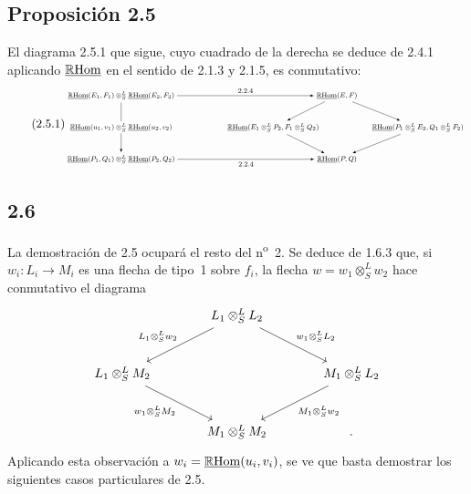 \subsection*{Proposición 2.5}
El diagrama 2.5.1 que sigue, cuyo cuadrado de la derecha se deduce de 2.4.1 aplicando $\underline{\mathbb{R}\mathrm{Hom}}$ en el sentido de 2.1.3 y 2.1.5, es conmutativo:
\begin{equation}\tag{2.5.1}
\resizebox{0.98\textwidth}{!}{%
\begin{tikzpicture}[>=latex,baseline=(current bounding box.center)]
\footnotesize
\node (A) at (0,2.6) {$\uRHom(E_1,F_1)\otimes^L_S\uRHom(E_2,F_2)$};
\node (C) at (0,0) {$\uRHom(P_1,Q_1)\otimes^L_S\uRHom(P_2,Q_2)$};
\node (D) at (8.8,2.6) {$\uRHom(E,F)$};
\node (E) at (6.2,1.3) {$\uRHom(E_1\otimes^L_SP_2,F_1\otimes^L_SQ_2)$};
\node (F) at (12.1,1.3) {$\uRHom(P_1\otimes^L_SE_2,Q_1\otimes^L_SF_2)$};
\node (G) at (8.8,0) {$\uRHom(P,Q)$};
\draw[->] (A) -- node[above] {$2.2.4$} (D);
\draw[->] (A) -- node[midway,fill=white,inner sep=2pt] {$\uRHom(u_1,v_1)\otimes^L_S\uRHom(u_2,v_2)$} (C);
\draw[->] (C) -- node[below] {$2.2.4$} (G);
\draw[->] (D) -- (E);
\draw[->] (D) -- (F);
\draw[->] (E) -- (G);
\draw[->] (F) -- (G);
\end{tikzpicture}}
\end{equation}

\subsection*{2.6}
La demostración de 2.5 ocupará el resto del n\textsuperscript{o}~2. Se deduce de 1.6.3 que, si $w_i:L_i\to M_i$ es una flecha de tipo~1 sobre $f_i$, la flecha $w=w_1\otimes^{L}_{S}w_2$ hace conmutativo el diagrama
\[
\begin{tikzcd}[column sep=large,row sep=large]
& L_1\otimes^L_S L_2 \arrow[dl,"{L_1\otimes^L_S w_2}"'] \arrow[dr,"{w_1\otimes^L_S L_2}"] & \\
L_1\otimes^L_S M_2 \arrow[dr,"{w_1\otimes^L_S M_2}"'] & & M_1\otimes^L_S L_2 \arrow[dl,"{M_1\otimes^L_S w_2}"]\\
& M_1\otimes^L_S M_2 & .
\end{tikzcd}
\]
Aplicando esta observación a $w_i=\underline{\mathbb{R}\mathrm{Hom}}(u_i,v_i)$, se ve que basta demostrar los siguientes casos particulares de 2.5.

